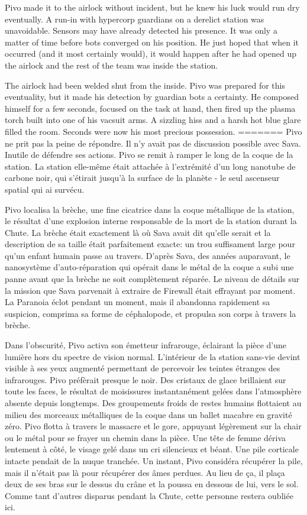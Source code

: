 Pivo made it to the airlock without incident, but he knew his luck would run dry eventually. A run-in with hypercorp guardians on a derelict station was unavoidable. Sensors may have already detected his presence. It was only a matter of time before bots converged on his position. He just hoped that when it occurred (and it most certainly would), it would happen after he had opened up the airlock and the rest of the team was inside the station. 

The airlock had been welded shut from the inside. Pivo was prepared for this eventuality, but it made his detection by guardian bots a certainty. He composed himself for a few seconds, focused on the task at hand, then fired up the plasma torch built into one of his vacsuit arms. A sizzling hiss and a harsh hot blue glare filled the room. Seconds were now his most precious possession. 
=======
Pivo ne prit pas la peine de répondre. Il n'y avait pas de discussion possible avec Sava. Inutile de défendre ses actions. Pivo se remit à ramper le long de la coque de la station. La station elle-même était attachée à l'extrémité d'un long nanotube de carbone noir, qui s'étirait jusqu'à la surface de la planète - le seul ascenseur spatial qui ai survécu. 

Pivo localisa la brèche, une fine cicatrice dans la coque métallique de la station, le résultat d'une explosion interne responsable de la mort de la station durant la Chute. La brèche était exactement là où Sava avait dit qu'elle serait et la description de sa taille était parfaitement exacte: un trou suffisament large pour qu'un enfant humain passe au travers. D'après Sava, des années auparavant, le nanosystème d'auto-réparation qui opérait dans le métal de la coque a subi une panne avant que la brèche ne soit complètement réparée. Le niveau de détails sur la mission que Sava parvenait à extraire de Firewall était effrayant par moment. La Paranoia éclot pendant un moment, mais il abandonna rapidement sa suspicion, comprima sa forme de céphalopode, et propulsa son corps à travers la brèche. 

Dans l'obscurité, Pivo activa son émetteur infrarouge, éclairant la pièce d'une lumière hors du spectre de vision normal. L'intérieur de la station sans-vie devint visible à ses yeux augmenté permettant de percevoir les teintes étranges des infrarouges. Pivo préfèrait presque le noir. Des cristaux de glace brillaient sur toute les faces, le résultat de moisissures instantanément gelées dans l'atmosphère absente depuis longtemps. Des groupements froids de restes humains flottaient au milieu des morceaux métalliques de la coque dans un ballet macabre en gravité zéro. Pivo flotta à travers le massacre et le gore, appuyant légèrement sur la chair ou le métal pour se frayer un chemin dans la pièce. Une tête de femme dériva lentement à côté, le visage gelé dans un cri silencieux et béant. Une pile corticale intacte pendait de la nuque tranchée. Un instant, Pivo considéra récupérer la pile, mais il n'était pas là pour récupérer des âmes perdues. Au lieu de ça, il plaça deux de ses bras sur le dessus du crâne et la poussa en dessous de lui, vers le sol. Comme tant d'autres disparus pendant la Chute, cette personne restera oubliée ici. 

